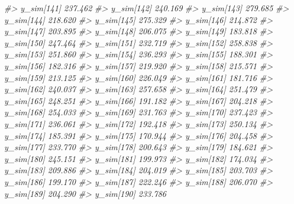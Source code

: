 \documentclass[
  10pt,
  italian,
  a4paper,
  extrafontsizes,onecolumn,openright
  ]{memoir}
\newenvironment{Shaded}{\begin{snugshade}}{\end{snugshade}}
\newcommand{\CommentTok}[1]{\textcolor[rgb]{0.56,0.35,0.01}{\textit{#1}}}
\begin{document}
\begin{Shaded}
\begin{Highlighting}[]
\CommentTok{\#\textgreater{}   y\_sim[141] 237.462}
\CommentTok{\#\textgreater{}   y\_sim[142] 240.169}
\CommentTok{\#\textgreater{}   y\_sim[143] 279.685}
\CommentTok{\#\textgreater{}   y\_sim[144] 218.620}
\CommentTok{\#\textgreater{}   y\_sim[145] 275.329}
\CommentTok{\#\textgreater{}   y\_sim[146] 214.872}
\CommentTok{\#\textgreater{}   y\_sim[147] 203.895}
\CommentTok{\#\textgreater{}   y\_sim[148] 206.075}
\CommentTok{\#\textgreater{}   y\_sim[149] 183.818}
\CommentTok{\#\textgreater{}   y\_sim[150] 247.464}
\CommentTok{\#\textgreater{}   y\_sim[151] 232.719}
\CommentTok{\#\textgreater{}   y\_sim[152] 258.838}
\CommentTok{\#\textgreater{}   y\_sim[153] 251.860}
\CommentTok{\#\textgreater{}   y\_sim[154] 236.293}
\CommentTok{\#\textgreater{}   y\_sim[155] 188.301}
\CommentTok{\#\textgreater{}   y\_sim[156] 182.316}
\CommentTok{\#\textgreater{}   y\_sim[157] 219.920}
\CommentTok{\#\textgreater{}   y\_sim[158] 215.571}
\CommentTok{\#\textgreater{}   y\_sim[159] 213.125}
\CommentTok{\#\textgreater{}   y\_sim[160] 226.049}
\CommentTok{\#\textgreater{}   y\_sim[161] 181.716}
\CommentTok{\#\textgreater{}   y\_sim[162] 240.037}
\CommentTok{\#\textgreater{}   y\_sim[163] 257.658}
\CommentTok{\#\textgreater{}   y\_sim[164] 251.479}
\CommentTok{\#\textgreater{}   y\_sim[165] 248.251}
\CommentTok{\#\textgreater{}   y\_sim[166] 191.182}
\CommentTok{\#\textgreater{}   y\_sim[167] 204.218}
\CommentTok{\#\textgreater{}   y\_sim[168] 254.033}
\CommentTok{\#\textgreater{}   y\_sim[169] 231.763}
\CommentTok{\#\textgreater{}   y\_sim[170] 237.423}
\CommentTok{\#\textgreater{}   y\_sim[171] 236.061}
\CommentTok{\#\textgreater{}   y\_sim[172] 192.418}
\CommentTok{\#\textgreater{}   y\_sim[173] 250.134}
\CommentTok{\#\textgreater{}   y\_sim[174] 185.391}
\CommentTok{\#\textgreater{}   y\_sim[175] 170.944}
\CommentTok{\#\textgreater{}   y\_sim[176] 204.458}
\CommentTok{\#\textgreater{}   y\_sim[177] 233.770}
\CommentTok{\#\textgreater{}   y\_sim[178] 200.643}
\CommentTok{\#\textgreater{}   y\_sim[179] 184.621}
\CommentTok{\#\textgreater{}   y\_sim[180] 245.151}
\CommentTok{\#\textgreater{}   y\_sim[181] 199.973}
\CommentTok{\#\textgreater{}   y\_sim[182] 174.034}
\CommentTok{\#\textgreater{}   y\_sim[183] 209.886}
\CommentTok{\#\textgreater{}   y\_sim[184] 204.019}
\CommentTok{\#\textgreater{}   y\_sim[185] 203.703}
\CommentTok{\#\textgreater{}   y\_sim[186] 199.170}
\CommentTok{\#\textgreater{}   y\_sim[187] 222.246}
\CommentTok{\#\textgreater{}   y\_sim[188] 206.070}
\CommentTok{\#\textgreater{}   y\_sim[189] 204.290}
\CommentTok{\#\textgreater{}   y\_sim[190] 233.786}

\end{Highlighting}
\end{Shaded}
\end{document}
